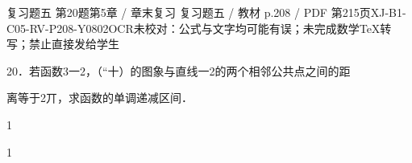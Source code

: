 \begin{bankitem}{复习题五 第20题}{第5章 / 章末复习 复习题五 / 教材 p.208 / PDF 第215页}{XJ-B1-C05-RV-P208-Y0802}{OCR未校对：公式与文字均可能有误；未完成数学TeX转写；禁止直接发给学生}
\begin{ocrdraft}
\par
20．若函数3一2，（“十）的图象与直线一2的两个相邻公共点之间的距
\par
离等于2丌，求函数的单调递减区间．
\par
1
\par
1
\end{ocrdraft}
\end{bankitem}
